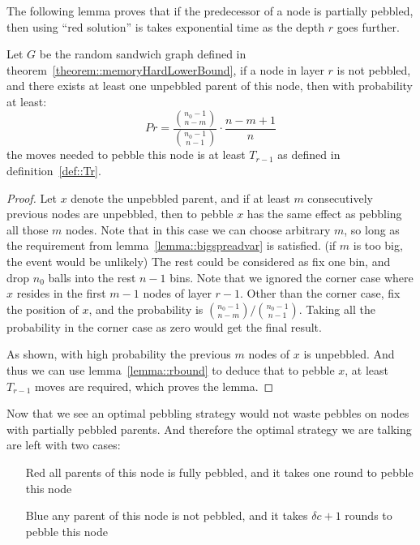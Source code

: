 The following lemma proves that if the predecessor of a node is partially pebbled, then using ``red solution'' is takes exponential
time as the depth $r$ goes further.

\begin{lemma}\label{lemma::quality}
  Let $G$ be the random sandwich graph defined in theorem~\ref{theorem::memoryHardLowerBound}, if a node in layer $r$
  is not pebbled, and there exists at least one unpebbled parent of this node, then with probability at least:
  \begin{equation}
    Pr = \frac{\binom{n_0 - 1}{n - m}}{\binom{n_0 - 1}{n - 1}} \cdot \frac{n - m + 1}{n}
  \end{equation}
  the moves needed to pebble this node is at least $T_{r - 1}$ as defined in definition~\ref{def::Tr}.
\end{lemma}

\begin{proof}
  Let $x$ denote the unpebbled parent, and if at least $m$ consecutively previous nodes are unpebbled, then to pebble $x$
  has the same effect as pebbling all those $m$ nodes. Note that in this case we can choose arbitrary $m$, so long as the
  requirement from lemma~\ref{lemma::bigspreadvar} is satisfied. (if $m$ is too big, the event would be unlikely) The rest
  could be considered as fix one bin, and drop $n_0$ balls into the rest $n - 1$ bins. Note that we ignored the corner
  case where $x$ resides in the first $m - 1$ nodes of layer $r - 1$. Other than the corner case, fix the position of $x$,
  and the probability is $\binom{n_0 - 1}{n - m}/\binom{n_0 - 1}{n - 1}$. Taking all the probability in the corner
  case as zero would get the final result.

  As shown, with high probability the previous $m$ nodes of $x$ is unpebbled. And thus we can use lemma~\ref{lemma::rbound}
  to deduce that to pebble $x$, at least $T_{r - 1}$ moves are required, which proves the lemma.
\end{proof}

Now that we see an optimal pebbling strategy would not waste pebbles on nodes with partially pebbled parents. And
therefore the optimal strategy we are talking are left with two cases:

\begin{itemize}
  \item[Red] all parents of this node is fully pebbled, and it takes one round to pebble this node
  \item[Blue] any parent of this node is not pebbled, and it takes $\delta c + 1$ rounds to pebble this node
\end{itemize}


